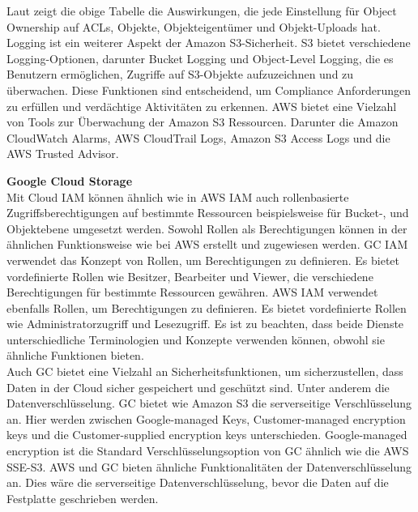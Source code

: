 Laut \citeauthor{aws-iam-s3} zeigt die obige Tabelle die Auswirkungen, die jede Einstellung für Object Ownership auf ACLs, Objekte, Objekteigentümer und Objekt-Uploads hat.\\

Logging ist ein weiterer Aspekt der Amazon S3-Sicherheit. S3 bietet verschiedene Logging-Optionen, darunter Bucket Logging und Object-Level Logging, die es Benutzern ermöglichen, Zugriffe auf S3-Objekte aufzuzeichnen und zu überwachen. Diese Funktionen sind entscheidend, um Compliance Anforderungen zu erfüllen und verdächtige Aktivitäten zu erkennen. AWS bietet eine Vielzahl von Tools zur Überwachung der Amazon S3 Ressourcen. Darunter die Amazon CloudWatch Alarms, AWS CloudTrail Logs, Amazon S3 Access Logs und die AWS Trusted Advisor.\\

\newpage

\textbf{Google Cloud Storage}\\

Mit Cloud IAM können ähnlich wie in AWS IAM auch rollenbasierte Zugriffsberechtigungen auf bestimmte Ressourcen beispielsweise für Bucket-, und Objektebene umgesetzt werden. Sowohl Rollen als Berechtigungen können in der ähnlichen Funktionsweise wie bei AWS erstellt und zugewiesen werden. GC IAM verwendet das Konzept von Rollen, um Berechtigungen zu definieren. Es bietet vordefinierte Rollen wie Besitzer, Bearbeiter und Viewer, die verschiedene Berechtigungen für bestimmte Ressourcen gewähren. AWS IAM verwendet ebenfalls Rollen, um Berechtigungen zu definieren. Es bietet vordefinierte Rollen wie Administratorzugriff und Lesezugriff. Es ist zu beachten, dass beide Dienste unterschiedliche Terminologien und Konzepte verwenden können, obwohl sie ähnliche Funktionen bieten.\\

Auch GC bietet eine Vielzahl an Sicherheitsfunktionen, um sicherzustellen, dass Daten in der Cloud sicher gespeichert und geschützt sind. Unter anderem die Datenverschlüsselung. GC bietet wie Amazon S3 die serverseitige Verschlüsselung an. Hier werden zwischen Google-managed Keys, Customer-managed encryption keys und die Customer-supplied encryption keys unterschieden. Google-managed encryption ist die Standard Verschlüsselungsoption von GC ähnlich wie die AWS SSE-S3. AWS und GC bieten ähnliche Funktionalitäten der Datenverschlüsselung an. Dies wäre die serverseitige Datenverschlüsselung, bevor die Daten auf die Festplatte geschrieben werden. 

